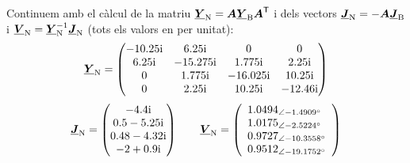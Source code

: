 \begin{exemple}
    Continuem amb el càlcul de la matriu $\underline{\boldsymbol{Y}}_\mathrm{N} =
    \boldsymbol{A} \underline{\boldsymbol{Y}}_\mathrm{B} \boldsymbol{A}^\mathrm{\textsf{T}}$ i dels
    vectors $\underline{\boldsymbol{J}}_\mathrm{N} = - \boldsymbol{A} \underline{\boldsymbol{J}}_\mathrm{B}$ i
    $\underline{\boldsymbol{V}}_\mathrm{N} = \underline{\boldsymbol{Y}}_\mathrm{N}^{-1} \underline{\boldsymbol{J}}_\mathrm{N}$ (tots
    els valors en per unitat):
    \[
       \mcmplx{Y}\ped{N} =
       \begin{pmatrix}
         \complexnum{-j 10,25} & \complexnum{j 6,25} & 0 & 0 \\
         \complexnum{j 6,25} & \complexnum{-j 15,275} & \complexnum{j 1,775} & \complexnum{j 2,25} \\
         0 & \complexnum{j 1,775 }& \complexnum{-j 16,025} & \complexnum{j 10,25} \\
         0 & \complexnum{j 2,25} & \complexnum{j 10,25} & \complexnum{-j 12,46}
       \end{pmatrix}
    \]
    \qquad
    \[
       \mcmplx{J}\ped{N} =
       \begin{pmatrix}
        \complexnum{-j 4,4} \\
        \complexnum{0,5 - j 5,25} \\
       \complexnum{ 0,48 - j 4,32} \\
        \complexnum{-2 + j 0,9}
       \end{pmatrix}
       \qquad
       \mcmplx{V}\ped{N} =
       \left(\begin{array}{l}
        \numpd{1,0494}{-1,4909} \\
        \numpd{1,0175}{-2,5224} \\
        \numpd{0,9727}{-10,3558} \\
        \numpd{0,9512}{-19,1752}
       \end{array}\right)
    \]


\end{exemple}
